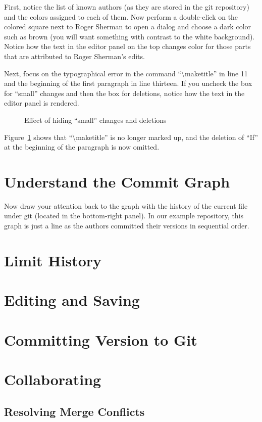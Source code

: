 First, notice the list of known authors (as they are stored in the git repository) and the colors assigned to each of them.  Now perform a double-click on the colored square next to Roger Sherman to open a dialog and  choose a dark color such as brown (you will want something with contrast to the white background).  Notice how the text in the editor panel on the top changes color for those parts that are attributed to Roger Sherman's edits.

Next, focus on the typographical error in the command ``\textbackslash maketitle'' in line 11 and the beginning of the first paragraph in line thirteen.  If you uncheck the box for ``small'' changes and then the box for deletions, notice how the text in the editor panel is rendered.
\begin{figure}[t]
\centering
{}
\caption{Effect of hiding ``small'' changes and deletions} \label{fig:editor-filter-small}
\end{figure}
Figure~\ref{fig:editor-filter-small} shows that ``\textbackslash maketitle'' is no longer marked up, and the deletion of ``If'' at the beginning of the paragraph is now omitted.

\section{Understand the Commit Graph}

Now draw your attention back to the graph with the history of the current file under git (located in the bottom-right panel).  In our example repository, this graph is just a line as the authors committed their versions in sequential order.


\section{Limit History}

\section{Editing and Saving}

\section{Committing Version to Git}

\section{Collaborating}

\subsection{Resolving Merge Conflicts}